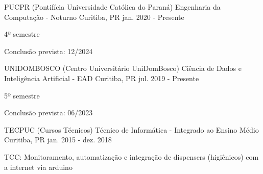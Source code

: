 

\begin{cventries}

  \cventry
    {PUCPR (Pontifícia Universidade Católica do Paraná)} %
    {Engenharia da Computação - Noturno} %
    {Curitiba, PR} %
    {jan. 2020 - Presente} %
    {
      \begin{cvitems} %
        \item {4º semestre}
        \item {Conclusão prevista: 12/2024}
      \end{cvitems}
    }

  \cventry
    {UNIDOMBOSCO (Centro Universitário UniDomBosco)} %
    {Ciência de Dados e Inteligência Artificial - EAD} %
    {Curitiba, PR} %
    {jul. 2019 - Presente} %
    {
      \begin{cvitems} %
        \item {5º semestre}
        \item {Conclusão prevista: 06/2023}
      \end{cvitems}
    }

  \cventry
    {TECPUC (Cursos Técnicos)} %
    {Técnico de Informática - Integrado ao Ensino Médio} %
    {Curitiba, PR} %
    {jan. 2015 - dez. 2018} %
    {
      \begin{cvitems} %
        \item {TCC: Monitoramento, automatização e integração de dispensers (higiênicos) com a internet via arduino}
      \end{cvitems}
    }


\end{cventries}
